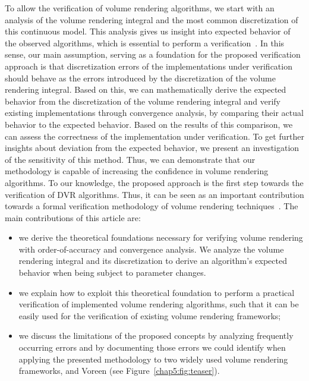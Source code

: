 To allow the verification of volume rendering algorithms, we start with an analysis of the volume rendering integral and the most common discretization of this continuous model. This analysis gives us insight into expected behavior of the observed algorithms, which is essential to perform a verification~\cite{159342}. In this sense, our main assumption, serving as a foundation for the proposed verification approach is that discretization errors of the implementations under verification should behave as the errors introduced by 
the discretization of the volume rendering integral. 
Based on this, we can mathematically derive the expected behavior from the discretization of the volume rendering integral and verify existing implementations through convergence analysis, by comparing their actual behavior to the expected behavior. 
Based on the results of this comparison, we can assess the correctness of the implementation under verification. To get further insights about deviation from the expected behavior, we present an investigation of the sensitivity of this method. 
Thus, we can demonstrate that our methodology is capable of increasing the confidence in volume rendering algorithms. To our knowledge, the proposed approach is the first step towards the verification of DVR algorithms. Thus, it can be seen as an important contribution towards a formal verification methodology of volume rendering techniques~\cite{roach98}.
The main contributions of this article are:
\begin{itemize}
\item we derive the theoretical foundations necessary for verifying volume rendering with order-of-accuracy and convergence analysis. We analyze the volume rendering integral and its discretization to derive an algorithm's expected behavior when being subject to parameter changes.
\item we explain how to exploit this theoretical foundation to perform a practical verification of implemented volume rendering algorithms, such that it can be easily used for the verification of existing volume rendering frameworks;
\item we discuss the limitations of the proposed concepts by analyzing frequently occurring errors and by documenting those errors we could identify when applying the presented methodology to two widely used volume rendering frameworks, 
 \cite{vtk} and Voreen \cite{MRMH09} (see Figure~\ref{chap5:fig:teaser}).
\end{itemize}

